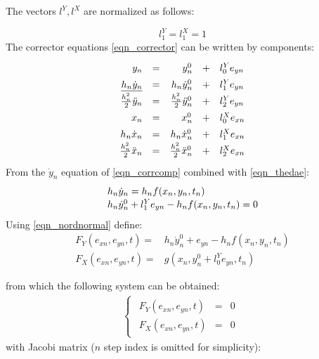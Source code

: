 \documentclass[lettersize,journal]{IEEEtran}
\begin{document}
The vectors \(l^Y,l^X\) are normalized as follows:

\begin{equation}
	\label{eqn_nordnormal}
		l^Y_1=l^X_1=1
\end{equation}
The corrector equations \eqref{eqn_corrector} can be written by components:
\begin{equation}
	\label{eqn_corrcomp}
	\def\arraystretch{1.4}
	\begin{array}{rlrll}
		y_n &= &y_n^0&+&l_0^Ye_{yn} \\
		\underline{h_n \dot{y}_n }&=& h_n \dot{y}_n^0&+&l_1^Ye_{yn} \\
		\frac{h_n^2}{2}\ddot{y}_n &=& \frac{h_n^2}{2}\ddot{y}_n^0& + &l_2^Ye_{yn} \\
		x_n &= &x_n^0&+&l_0^Xe_{xn} \\
		h_n \dot{x}_n &=& h_n \dot{x}_n^0&+&l_1^Xe_{xn} \\
		\frac{h_n^2}{2}\ddot{x}_n &=& \frac{h_n^2}{2}\ddot{x}_n^0& + &l_2^Xe_{xn} \\
	\end{array}
\end{equation}
From the \(\dot{y}_n\) equation of \eqref{eqn_corrcomp} combined with \eqref{eqn_thedae}:
\begin{equation}
	\label{eqn_corrdiff}
	\def\arraystretch{1.1}
	\begin{array}{l}
		h_n\dot{y}_n =  h_nf(x_n,y_n,t_n)\\
		h_n\dot{y}_n^0+l_1^Ye_{yn} - h_nf(x_n,y_n,t_n) = 0
	\end{array}
\end{equation}
Using \eqref{eqn_nordnormal} define:
\begin{equation}
	\label{eqn_define}
	\begin{array}{rl}
		F_Y(e_{xn}, e_{yn}, t) =& h_n\dot{y}_n^0+e_{yn}-h_nf(x_n, y_n, t_n) \\
		F_X(e_{xn}, e_{yn}, t) =& g(x_n, y_n^0+l_0^Ye_{yn}, t_n)
	\end{array}
\end{equation}

\noindent from which the following system can be obtained:
\begin{equation}
	\label{eqn_system1}
	\begin{array}{c}
		\begin{cases}
			\begin{array}{rcl}
			F_Y(e_{xn}, e_{yn}, t) &=&0 \\
			F_X(e_{xn}, e_{yn}, t) &=&0 
			\end{array}
		\end{cases} 
	\end{array}
\end{equation}
\noindent with Jacobi matrix (\(n\) step index is omitted for simplicity):
\end{document}
